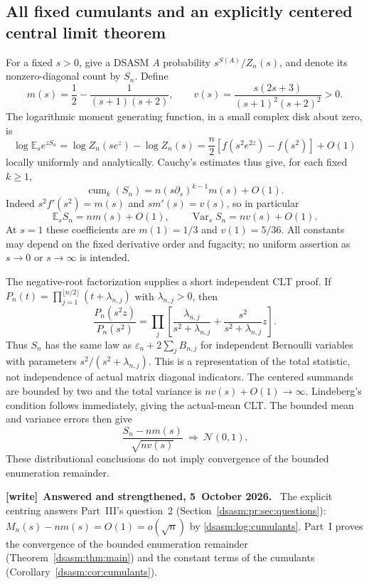 \documentclass[11pt,letterpaper]{article}
\theoremstyle{remark}\newtheorem{remark}[theorem]{Remark}
\newcommand{\eps}{\varepsilon}\newcommand{\HH}{\mathcal H}\newcommand{\one}{\mathbf1}
\newenvironment{writenote}[1][]{\par\smallskip\begingroup\small
 \noindent\textbf{[write]}\if\relax\detokenize{#1}\relax\else~\textbf{#1.}\fi\ }%
 {\par\endgroup\smallskip}
\begin{document}
\subsection{All fixed cumulants and an explicitly centered central limit theorem}
For a fixed $s>0$, give a DSASM $A$ probability $s^{S(A)}/Z_n(s)$,
and denote its nonzero-diagonal count by $S_n$. Define
\begin{equation}\label{dsasm:log:meanvariancecoefs}
 m(s)=\frac12-\frac1{(s+1)(s+2)},\qquad
 v(s)=\frac{s(2s+3)}{(s+1)^2(s+2)^2}>0.
\end{equation}
The logarithmic moment generating function, in a small complex disk
about zero, is
\[
 \log\mathbb E_s e^{zS_n}
 =\log Z_n(se^z)-\log Z_n(s)
 =\frac n2[f(s^2e^{2z})-f(s^2)]+O(1)
\]
locally uniformly and analytically. Cauchy's estimates thus give,
for each fixed $k\ge1$,
\begin{equation}\label{dsasm:log:cumulants}
 \operatorname{cum}_k(S_n)
 =n(s\partial_s)^{k-1}m(s)+O(1).
\end{equation}
Indeed $s^2f'(s^2)=m(s)$ and $sm'(s)=v(s)$, so in particular
\[
 \mathbb E_sS_n=nm(s)+O(1),\qquad
 \operatorname{Var}_sS_n=nv(s)+O(1).
\]
At $s=1$ these coefficients are $m(1)=1/3$ and $v(1)=5/36$.
All constants may depend on the fixed derivative order and fugacity;
no uniform assertion as $s\to0$ or $s\to\infty$ is intended.

The negative-root factorization supplies a short independent CLT
proof. If $P_n(t)=\prod_{j=1}^{\lfloor n/2\rfloor}(t+\lambda_{n,j})$
with $\lambda_{n,j}>0$, then
\[
 \frac{P_n(s^2z)}{P_n(s^2)}
 =\prod_j\left[\frac{\lambda_{n,j}}{s^2+\lambda_{n,j}}
                    +\frac{s^2}{s^2+\lambda_{n,j}}z\right].
\]
Thus $S_n$ has the same law as $\eps_n+2\sum_jB_{n,j}$ for independent
Bernoulli variables with parameters $s^2/(s^2+\lambda_{n,j})$.
This is a representation of the total statistic, not independence
of actual matrix diagonal indicators. The centered summands are
bounded by two and the total variance is $nv(s)+O(1)\to\infty$.
Lindeberg's condition follows immediately, giving the actual-mean
CLT. The bounded mean and variance errors then give
\begin{equation}\label{dsasm:log:explicitCLT}
 \frac{S_n-nm(s)}{\sqrt{nv(s)}}\ \Longrightarrow\ \mathcal N(0,1).
\end{equation}
These distributional conclusions do not imply convergence of the
bounded enumeration remainder.
\begin{writenote}[Answered and strengthened, 5~October 2026]
The explicit centring answers Part~III's question~2 (Section~\ref{dsasm:pr:sec:questions}): $M_n(s)-nm(s)=O(1)=o(\sqrt n)$ by \eqref{dsasm:log:cumulants}. Part~I proves the convergence of the bounded enumeration remainder (Theorem~\ref{dsasm:thm:main}) and the constant terms of the cumulants (Corollary~\ref{dsasm:cor:cumulants}).
\end{writenote}
\end{document}
